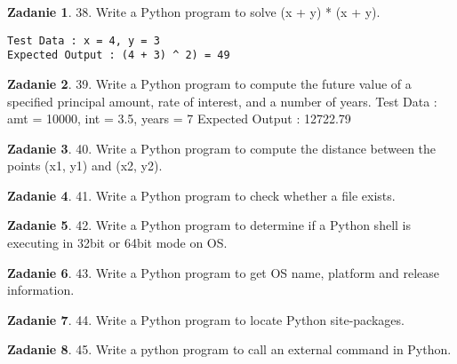 \documentclass[11pt]{article}
\theoremstyle{definition}
\newtheorem{zadanie}{Zadanie}
\begin{document}
\begin{zadanie}


38. Write a Python program to solve (x + y) * (x + y). 
\begin{verbatim}
Test Data : x = 4, y = 3
Expected Output : (4 + 3) ^ 2) = 49
\end{verbatim}
\end{zadanie}

\begin{zadanie}


39. Write a Python program to compute the future value of a specified principal amount, rate of interest, and a number of years. 
Test Data : amt = 10000, int = 3.5, years = 7
Expected Output : 12722.79

\end{zadanie}

\begin{zadanie}


40. Write a Python program to compute the distance between the points (x1, y1) and (x2, y2). 

\end{zadanie}

\begin{zadanie}


41. Write a Python program to check whether a file exists. 

\end{zadanie}

\begin{zadanie}


42. Write a Python program to determine if a Python shell is executing in 32bit or 64bit mode on OS. 

\end{zadanie}

\begin{zadanie}


43. Write a Python program to get OS name, platform and release information. 

\end{zadanie}

\begin{zadanie}


44. Write a Python program to locate Python site-packages. 

\end{zadanie}

\begin{zadanie}


45. Write a python program to call an external command in Python. 

\end{zadanie}
\end{document}
